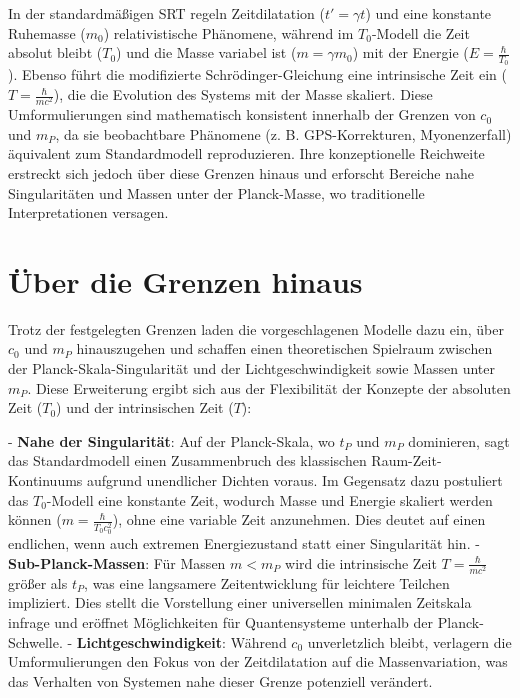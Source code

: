 \documentclass[a4paper,12pt]{article}
\begin{document}
	In der standardmäßigen SRT regeln Zeitdilatation (\( t' = \gamma t \)) und eine konstante Ruhemasse (\( m_0 \)) relativistische Phänomene, während im \( T_0 \)-Modell die Zeit absolut bleibt (\( T_0 \)) und die Masse variabel ist (\( m = \gamma m_0 \)) mit der Energie (\( E = \frac{\hbar}{T_0} \)). Ebenso führt die modifizierte Schrödinger-Gleichung eine intrinsische Zeit ein (\( T = \frac{\hbar}{m c^2} \)), die die Evolution des Systems mit der Masse skaliert. Diese Umformulierungen sind mathematisch konsistent innerhalb der Grenzen von \( c_0 \) und \( m_P \), da sie beobachtbare Phänomene (z. B. GPS-Korrekturen, Myonenzerfall) äquivalent zum Standardmodell reproduzieren. Ihre konzeptionelle Reichweite erstreckt sich jedoch über diese Grenzen hinaus und erforscht Bereiche nahe Singularitäten und Massen unter der Planck-Masse, wo traditionelle Interpretationen versagen.
	
	\section{Über die Grenzen hinaus}
	Trotz der festgelegten Grenzen laden die vorgeschlagenen Modelle dazu ein, über \( c_0 \) und \( m_P \) hinauszugehen und schaffen einen theoretischen Spielraum zwischen der Planck-Skala-Singularität und der Lichtgeschwindigkeit sowie Massen unter \( m_P \). Diese Erweiterung ergibt sich aus der Flexibilität der Konzepte der absoluten Zeit (\( T_0 \)) und der intrinsischen Zeit (\( T \)):
	
	- \textbf{Nahe der Singularität}: Auf der Planck-Skala, wo \( t_P \) und \( m_P \) dominieren, sagt das Standardmodell einen Zusammenbruch des klassischen Raum-Zeit-Kontinuums aufgrund unendlicher Dichten voraus. Im Gegensatz dazu postuliert das \( T_0 \)-Modell eine konstante Zeit, wodurch Masse und Energie skaliert werden können (\( m = \frac{\hbar}{T_0 c_0^2} \)), ohne eine variable Zeit anzunehmen. Dies deutet auf einen endlichen, wenn auch extremen Energiezustand statt einer Singularität hin.
	- \textbf{Sub-Planck-Massen}: Für Massen \( m < m_P \) wird die intrinsische Zeit \( T = \frac{\hbar}{m c^2} \) größer als \( t_P \), was eine langsamere Zeitentwicklung für leichtere Teilchen impliziert. Dies stellt die Vorstellung einer universellen minimalen Zeitskala infrage und eröffnet Möglichkeiten für Quantensysteme unterhalb der Planck-Schwelle.
	- \textbf{Lichtgeschwindigkeit}: Während \( c_0 \) unverletzlich bleibt, verlagern die Umformulierungen den Fokus von der Zeitdilatation auf die Massenvariation, was das Verhalten von Systemen nahe dieser Grenze potenziell verändert.
	
\end{document}
